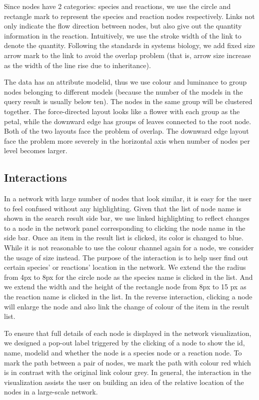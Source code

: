 \documentclass[journal]{vgtc}                %
\begin{document}
Since nodes have 2 categories: species and reactions, we use the circle and rectangle mark to represent the species and reaction nodes respectively. Links not only indicate the flow direction between nodes, but also give out the quantity information in the reaction. Intuitively, we use the stroke width of the link to denote the quantity. Following the standards in systems biology, we add fixed size arrow mark to the link to avoid the overlap problem (that is, arrow size increase as the width of the line rise due to inheritance). 

The data has an attribute model\textunderscore id, thus we use colour and luminance to group nodes belonging to different models (because the number of the models in the query result is usually below ten). The nodes in the same group will be clustered together. The force-directed layout looks like a flower with each group as the petal, while the downward edge has groups of leaves connected to the root node. Both of the two layouts face the problem of overlap. The downward edge layout face the problem more severely in the horizontal axis when number of nodes per level becomes larger. 

\subsection{Interactions}
In a network with large number of nodes that look similar, it is easy for the user to feel confused without any highlighting. Given that the list of node name is shown in the search result side bar, we use linked highlighting to reflect changes to a node in the network panel corresponding to clicking the node name in the side bar. Once an item in the result list is clicked, its color is changed to blue. While it is not reasonable to use the colour channel again for a node, we consider the usage of size instead. The purpose of the interaction is to help user find out certain species’ or reactions’  location in the network. We extend the the radius from 4px to 8px for the circle node as the species name is clicked in the list. And we extend the width and the height of the rectangle node from 8px to 15 px as the reaction name is clicked in the list. In the reverse interaction, clicking a node will enlarge the node and also link the change of colour of the item in the result list.
 
To ensure that full details of each node is displayed in the network visualization, we designed a pop-out label triggered by the clicking of a node to show the id, name, model\textunderscore id and whether the node is a species node or a reaction node. To mark the path between a pair of nodes, we mark the path with colour red which is in contrast with the original link colour grey. In general, the interaction in the visualization assists the user on building an idea of the relative location of the nodes in a large-scale network.
\end{document}
